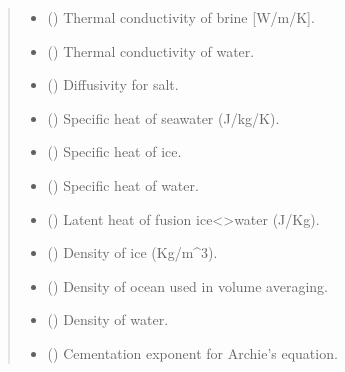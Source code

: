 \documentclass[a4paper,11pt,english,openany]{sphinxmanual}
\begin{document}
\begin{fulllineitems}
\begin{quote}
\begin{description}
\begin{itemize}
\item {} 
\sphinxAtStartPar
{} () \textendash{} Thermal conductivity of brine {[}W/m/K{]}.

\item {} 
\sphinxAtStartPar
{} () \textendash{} Thermal conductivity of water.

\item {} 
\sphinxAtStartPar
{} () \textendash{} Diffusivity for salt.

\item {} 
\sphinxAtStartPar
{} () \textendash{} Specific heat of seawater (J/kg/K).

\item {} 
\sphinxAtStartPar
{} () \textendash{} Specific heat of ice.

\item {} 
\sphinxAtStartPar
{} () \textendash{} Specific heat of water.

\item {} 
\sphinxAtStartPar
{} () \textendash{} Latent heat of fusion ice\textless{}\sphinxhyphen{}\textgreater{}water (J/Kg).

\item {} 
\sphinxAtStartPar
{} () \textendash{} Density of ice (Kg/m\textasciicircum{}3).

\item {} 
\sphinxAtStartPar
{} () \textendash{} Density of ocean used in volume averaging.

\item {} 
\sphinxAtStartPar
{} () \textendash{} Density of water.

\item {} 
\sphinxAtStartPar
{} () \textendash{} Cementation exponent for Archie’s equation.


\end{itemize}
\end{description}
\end{quote}
\end{fulllineitems}
\end{document}
